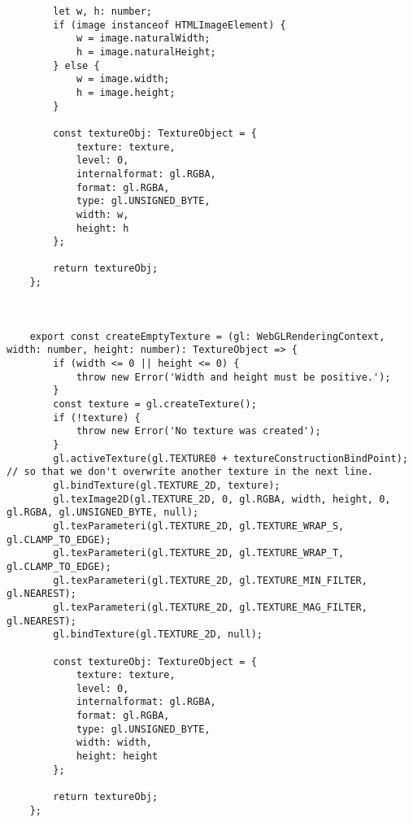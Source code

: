 \begin{lstlisting}
        let w, h: number;
        if (image instanceof HTMLImageElement) {
            w = image.naturalWidth;
            h = image.naturalHeight;
        } else {
            w = image.width;
            h = image.height;
        }
    
        const textureObj: TextureObject = {
            texture: texture,
            level: 0,
            internalformat: gl.RGBA,
            format: gl.RGBA,
            type: gl.UNSIGNED_BYTE,
            width: w,
            height: h
        };
    
        return textureObj;
    };
    
    
    
    export const createEmptyTexture = (gl: WebGLRenderingContext, width: number, height: number): TextureObject => {
        if (width <= 0 || height <= 0) {
            throw new Error('Width and height must be positive.');
        }
        const texture = gl.createTexture();
        if (!texture) {
            throw new Error('No texture was created');
        }
        gl.activeTexture(gl.TEXTURE0 + textureConstructionBindPoint); // so that we don't overwrite another texture in the next line.
        gl.bindTexture(gl.TEXTURE_2D, texture);
        gl.texImage2D(gl.TEXTURE_2D, 0, gl.RGBA, width, height, 0, gl.RGBA, gl.UNSIGNED_BYTE, null);
        gl.texParameteri(gl.TEXTURE_2D, gl.TEXTURE_WRAP_S, gl.CLAMP_TO_EDGE);
        gl.texParameteri(gl.TEXTURE_2D, gl.TEXTURE_WRAP_T, gl.CLAMP_TO_EDGE);
        gl.texParameteri(gl.TEXTURE_2D, gl.TEXTURE_MIN_FILTER, gl.NEAREST);
        gl.texParameteri(gl.TEXTURE_2D, gl.TEXTURE_MAG_FILTER, gl.NEAREST);
        gl.bindTexture(gl.TEXTURE_2D, null);
    
        const textureObj: TextureObject = {
            texture: texture,
            level: 0,
            internalformat: gl.RGBA,
            format: gl.RGBA,
            type: gl.UNSIGNED_BYTE,
            width: width,
            height: height
        };
    
        return textureObj;
    };
    

\end{lstlisting}
